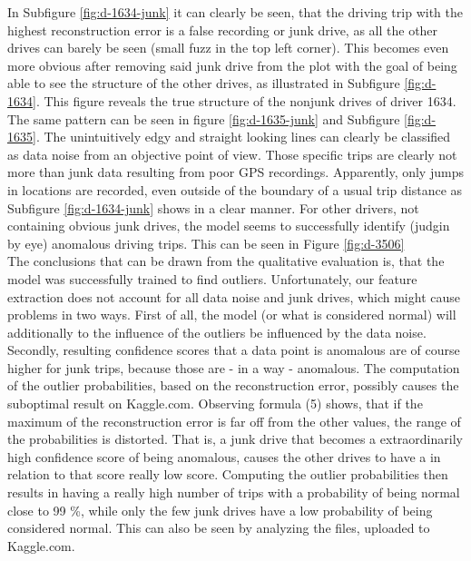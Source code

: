 \documentclass{vldb}
\begin{document}
In Subfigure \ref{fig:d-1634-junk}  it can clearly be seen, that the driving trip with the highest reconstruction error is a false recording or junk drive, as all the other drives can barely be seen (small fuzz in the top left corner). This becomes even more obvious after removing said junk drive from the plot with the goal of being able to see the structure of the other drives, as illustrated in Subfigure \ref{fig:d-1634}. This figure reveals the true structure of the nonjunk drives of driver 1634. The same pattern can be seen in figure \ref{fig:d-1635-junk} and Subfigure \ref{fig:d-1635}. The unintuitively edgy and straight looking lines can clearly be classified as data noise from an objective point of view. Those specific trips are clearly not more than junk data resulting from poor GPS recordings. Apparently, only jumps in locations are recorded, even outside of the boundary of a usual trip distance as Subfigure \ref{fig:d-1634-junk} shows in a clear manner. For other drivers, not containing obvious junk drives, the model seems to successfully identify (judgin by eye) anomalous driving trips. This can be seen in Figure \ref{fig:d-3506}\\
The conclusions that can be drawn from the qualitative evaluation is, that the model was successfully trained to find outliers. Unfortunately, our feature extraction does not account for all data noise and junk drives, which might cause problems in two ways. First of all, the model (or what is considered normal) will additionally to the influence of the outliers be influenced by the data noise. Secondly, resulting confidence scores that a data point is anomalous are of course higher for junk trips, because those are - in a way - anomalous. The computation of the outlier probabilities, based on the reconstruction error, possibly causes the suboptimal result on Kaggle.com. Observing formula (5) shows, that if the maximum of the reconstruction error is far off from the other values, the range of the probabilities is distorted. That is, a junk drive that becomes a extraordinarily high confidence score of being anomalous, causes the other drives to have a in relation to that score really low score. Computing the outlier probabilities then results in having a really high number of trips with a probability of being normal close to 99 \%, while only the few junk drives have a low probability of being considered normal.
This can also be seen by analyzing the files, uploaded to Kaggle.com.
\end{document}
